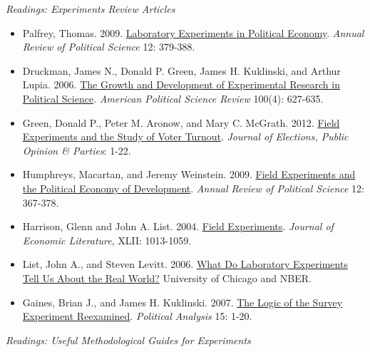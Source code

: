 \documentclass{article}
\begin{document}
\emph{Readings: Experiments Review Articles}
\begin{itemize}
\item Palfrey, Thomas. 2009.
  \href{http://arjournals.annualreviews.org/doi/pdf/10.1146/annurev.polisci.12.091007.122139}
  {Laboratory Experiments in Political Economy}.\textit{ Annual Review of
  Political Science} 12: 379-388.
\item Druckman, James N., Donald P. Green, James H. Kuklinski, and
  Arthur Lupia. 2006.
  \href{http://journals.cambridge.org/abstract_S0003055406062514} {The
    Growth and Development of Experimental Research in Political
    Science}.\textit{ American Political Science Review} 100(4): 627-635.
\item Green, Donald P., Peter M. Aronow, and Mary C. McGrath. 2012. \href{http://www.tandfonline.com/doi/abs/10.1080/17457289.2012.728223}{Field Experiments and the Study of Voter Turnout}. \textit{Journal of Elections, Public Opinion \& Parties}: 1-22.
\item Humphreys, Macartan, and Jeremy Weinstein. 2009.
  \href{http://www.columbia.edu/~mh2245/papers1/HW_ARPS09.pdf} {Field
    Experiments and the Political Economy of Development}. \textit{Annual
  Review of Political Science} 12: 367-378.
\item Harrison, Glenn and John A. List. 2004.
  \href{http://people.hbs.edu/nashraf/Harrison_Field%20Experiments_2004.pdf}
  {Field Experiments}. \textit{Journal of Economic Literature}, XLII:
  1013-1059.
\item List, John A., and Steven Levitt. 2006. \href{http://pricetheory.uchicago.edu/levitt/Papers/jep%20revision%20Levitt%20%26%20List.pdf}
  {What Do Laboratory Experiments Tell Us About the Real World?}
  University of Chicago and NBER.
\item Gaines, Brian J., and James H. Kuklinski. 2007.
  \href{http://pan.oxfordjournals.org/cgi/content/abstract/15/1/1}
  {The Logic of the Survey Experiment Reexamined}. \textit{Political Analysis}
  15: 1-20.
\end{itemize}

\emph{Readings: Useful Methodological Guides for Experiments}
\end{document}
